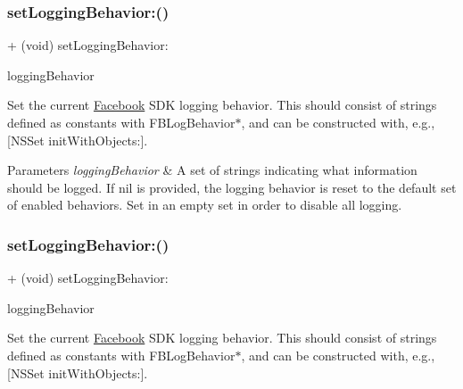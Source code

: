 \subsubsection{\texorpdfstring{set\+Logging\+Behavior\+:()}{setLoggingBehavior:()}\hspace{0.1cm}{\footnotesize\ttfamily [4/5]}}
{\footnotesize\ttfamily + (void) set\+Logging\+Behavior\+: \begin{DoxyParamCaption}\item[{(N\+S\+Set $\ast$)}]{logging\+Behavior }\end{DoxyParamCaption}}

Set the current \hyperlink{interfaceFacebook}{Facebook} S\+DK logging behavior. This should consist of strings defined as constants with F\+B\+Log\+Behavior$\ast$, and can be constructed with, e.\+g., \mbox{[}N\+S\+Set init\+With\+Objects\+:\mbox{]}.


\begin{DoxyParams}{Parameters}
{\em logging\+Behavior} & A set of strings indicating what information should be logged. If nil is provided, the logging behavior is reset to the default set of enabled behaviors. Set in an empty set in order to disable all logging. \\
\hline
\end{DoxyParams}
\mbox{\label{interfaceFBSettings_aaaf513653d6a8e2d05e0ecea865155c0}} 
\subsubsection{\texorpdfstring{set\+Logging\+Behavior\+:()}{setLoggingBehavior:()}\hspace{0.1cm}{\footnotesize\ttfamily [5/5]}}
{\footnotesize\ttfamily + (void) set\+Logging\+Behavior\+: \begin{DoxyParamCaption}\item[{(N\+S\+Set $\ast$)}]{logging\+Behavior }\end{DoxyParamCaption}}

Set the current \hyperlink{interfaceFacebook}{Facebook} S\+DK logging behavior. This should consist of strings defined as constants with F\+B\+Log\+Behavior$\ast$, and can be constructed with, e.\+g., \mbox{[}N\+S\+Set init\+With\+Objects\+:\mbox{]}.


